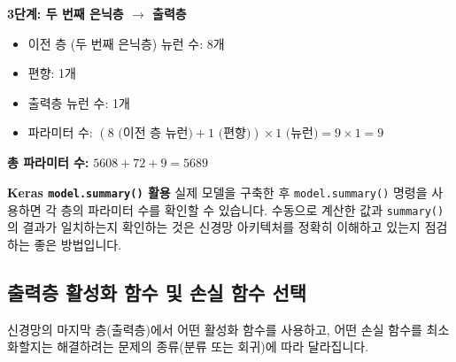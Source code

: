 \documentclass[11pt,a4paper]{article}
\theoremstyle{definition}
\begin{document}
\begin{enumerate}
\begin{examplebox}
    \textbf{3단계: 두 번째 은닉층 $\rightarrow$ 출력층}
    \begin{itemize}
        \item 이전 층 (두 번째 은닉층) 뉴런 수: 8개
        \item 편향: 1개
        \item 출력층 뉴런 수: 1개
        \item 파라미터 수: $(8 \text{ (이전 층 뉴런)} + 1 \text{ (편향)}) \times 1 \text{ (뉴런)} = 9 \times 1 = 9$
    \end{itemize}

    \textbf{총 파라미터 수:} $5608 + 72 + 9 = 5689$
    \end{examplebox}

    \begin{tipbox}
    \textbf{Keras \texttt{model.summary()} 활용}
    실제 모델을 구축한 후 \texttt{model.summary()} 명령을 사용하면 각 층의 파라미터 수를 확인할 수 있습니다. 수동으로 계산한 값과 \texttt{summary()}의 결과가 일치하는지 확인하는 것은 신경망 아키텍처를 정확히 이해하고 있는지 점검하는 좋은 방법입니다.
    \end{tipbox}
\end{enumerate}

\subsection{출력층 활성화 함수 및 손실 함수 선택}
신경망의 마지막 층(출력층)에서 어떤 활성화 함수를 사용하고, 어떤 손실 함수를 최소화할지는 해결하려는 문제의 종류(분류 또는 회귀)에 따라 달라집니다.
\end{document}
